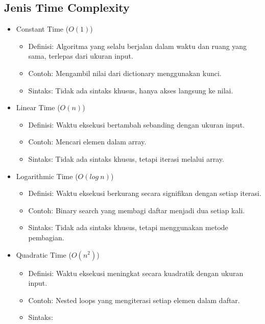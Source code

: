 \documentclass{article}
\begin{document}
\subsection{Jenis Time Complexity}
\begin{itemize}
    \item Constant Time (\(O(1)\))
          \begin{itemize}
              \item Definisi: Algoritma yang selalu berjalan dalam waktu dan ruang yang sama, terlepas dari ukuran input.
              \item Contoh: Mengambil nilai dari dictionary menggunakan kunci.
              \item Sintaks: Tidak ada sintaks khusus, hanya akses langsung ke nilai.
          \end{itemize}
    \item Linear Time (\(O(n)\))
          \begin{itemize}
              \item Definisi: Waktu eksekusi bertambah sebanding dengan ukuran input.
              \item Contoh: Mencari elemen dalam array.
              \item Sintaks: Tidak ada sintaks khusus, tetapi iterasi melalui array.
          \end{itemize}
    \item Logarithmic Time (\(O(log\ n)\))
          \begin{itemize}
              \item Definisi: Waktu eksekusi berkurang secara signifikan dengan setiap iterasi.
              \item Contoh: Binary search yang membagi daftar menjadi dua setiap kali.
              \item Sintaks: Tidak ada sintaks khusus, tetapi menggunakan metode pembagian.
          \end{itemize}
    \item Quadratic Time (\(O(n^2)\))
          \begin{itemize}
              \item Definisi: Waktu eksekusi meningkat secara kuadratik dengan ukuran input.
              \item Contoh: Nested loops yang mengiterasi setiap elemen dalam daftar.
              \item Sintaks:
                    \begin{lstlisting}[language=Python, caption={}, captionpos=b]

\end{lstlisting}
\end{itemize}
\end{itemize}
\end{document}
